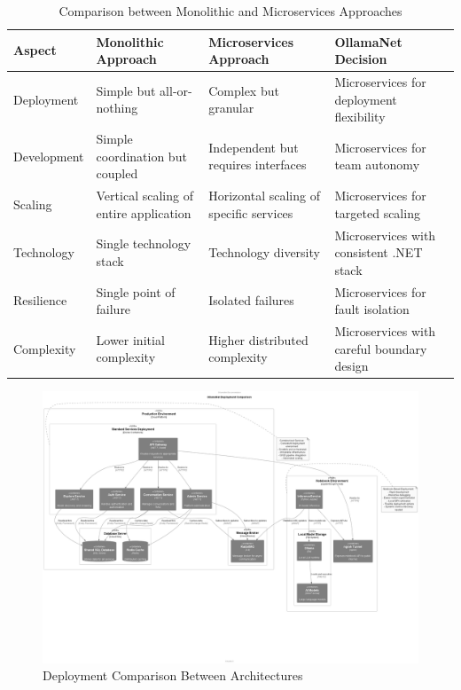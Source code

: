 \begin{table}[h]
  \centering
  \caption{Comparison between Monolithic and Microservices Approaches}
  \label{tab:mono-vs-micro}
  \begin{tabular}{|l|p{3.5cm}|p{3.5cm}|p{3.5cm}|}
    \hline
    \textbf{Aspect} & \textbf{Monolithic Approach} & \textbf{Microservices Approach} & \textbf{OllamaNet Decision} \\
    \hline
    Deployment & Simple but all-or-nothing & Complex but granular & Microservices for deployment flexibility \\
    \hline
    Development & Simple coordination but coupled & Independent but requires interfaces & Microservices for team autonomy \\
    \hline
    Scaling & Vertical scaling of entire application & Horizontal scaling of specific services & Microservices for targeted scaling \\
    \hline
    Technology & Single technology stack & Technology diversity & Microservices with consistent .NET stack \\
    \hline
    Resilience & Single point of failure & Isolated failures & Microservices for fault isolation \\
    \hline
    Complexity & Lower initial complexity & Higher distributed complexity & Microservices with careful boundary design \\
    \hline
  \end{tabular}
\end{table}

\begin{figure}[p]
    \centering
    \includegraphics[width=\textwidth]{./Chapter02/figures/Deployment_Comparison.png}
    \caption{Deployment Comparison Between Architectures}
    \label{fig:deploy-comparison}
\end{figure}
\clearpage

